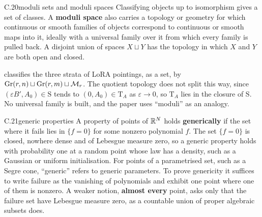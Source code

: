 
\begin{bgentry}{C.20}{moduli sets and moduli spaces}
Classifying objects up to isomorphism gives a set of classes. A \textbf{moduli space} also carries a topology or
geometry for which continuous or smooth families of objects correspond to continuous or smooth maps into it, ideally
with a universal family over it from which every family is pulled back. A disjoint union of spaces $X\sqcup Y$ has the
topology in which $X$ and $Y$ are both open and closed.
\end{bgentry}

 classifies the three strata of LoRA pointings, as a set, by $\operatorname{Gr}(r,n)\sqcup\operatorname{Gr}(r,m)\sqcup\mathcal{M}_r$.
The quotient topology does not split this way, since $(\varepsilon B',A_0)\in\mathrm S$ tends to $(0,A_0)\in\mathrm T_A$
as $\varepsilon\to0$, so $\mathrm T_A$ lies in the closure of $\mathrm S$. No universal family is built, and the paper
uses ``moduli'' as an analogy.


\begin{bgentry}{C.21}{generic properties}
A property of points of $\mathbb{R}^N$ holds \textbf{generically} if the set where it fails lies in $\{f=0\}$ for some nonzero
polynomial $f$. The set $\{f=0\}$ is closed, nowhere dense and of Lebesgue measure zero, so a generic property holds
with probability one at a random point whose law has a density, such as a Gaussian or uniform initialisation. For points
of a parametrised set, such as a Segre cone, ``generic'' refers to generic parameters. To prove genericity it suffices
to write failure as the vanishing of polynomials and exhibit one point where one of them is nonzero. A weaker notion,
\textbf{almost every} point, asks only that the failure set have Lebesgue measure zero, as a countable union of proper
algebraic subsets does.
\end{bgentry}

